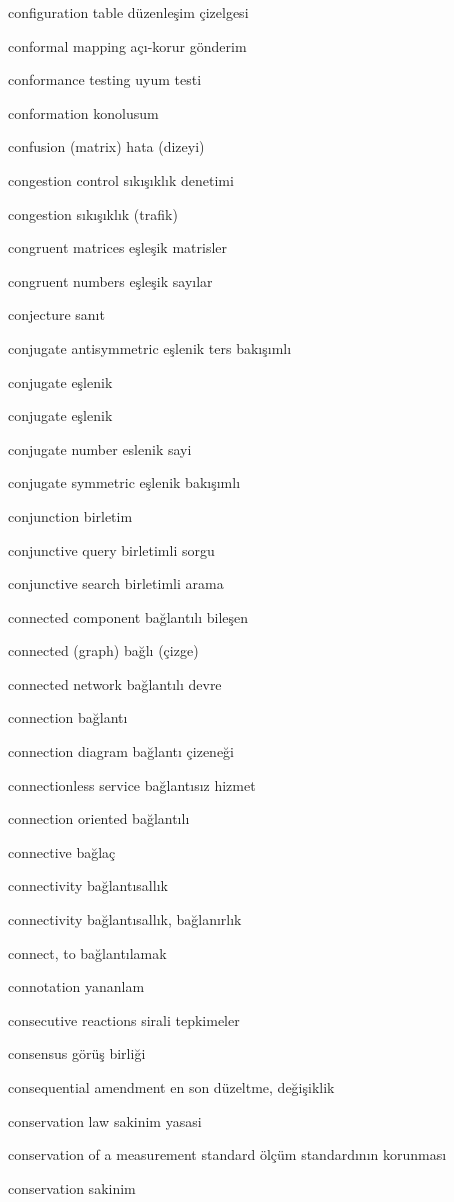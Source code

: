 \documentclass[12pt,fleqn]{article}\usepackage{../../common}
\begin{document}
configuration table düzenleşim çizelgesi

conformal mapping açı-korur gönderim

conformance testing uyum testi

conformation konolusum

confusion (matrix) hata (dizeyi)

congestion control sıkışıklık denetimi

congestion sıkışıklık (trafik)

congruent matrices eşleşik matrisler

congruent numbers eşleşik sayılar

conjecture sanıt

conjugate antisymmetric eşlenik ters bakışımlı

conjugate eşlenik

conjugate eşlenik

conjugate number eslenik sayi

conjugate symmetric eşlenik bakışımlı

conjunction birletim

conjunctive query birletimli sorgu

conjunctive search birletimli arama

connected component bağlantılı bileşen

connected (graph) bağlı (çizge)

connected network bağlantılı devre

connection bağlantı

connection diagram bağlantı çizeneği

connectionless service bağlantısız hizmet

connection oriented bağlantılı

connective bağlaç

connectivity bağlantısallık

connectivity bağlantısallık, bağlanırlık

connect, to bağlantılamak

connotation yananlam

consecutive reactions sirali tepkimeler

consensus görüş birliği

consequential amendment en son düzeltme, değişiklik

conservation law sakinim yasasi

conservation of a measurement standard ölçüm standardının korunması

conservation sakinim
\end{document}
